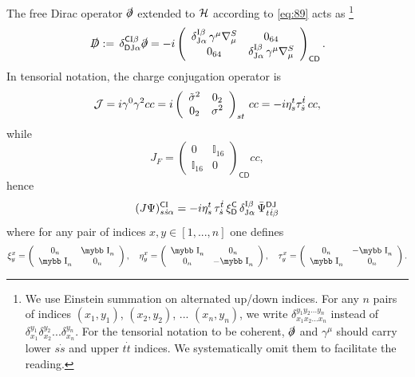 \documentclass[11pt]{article}
\newcommand{\ds}{\slashed \partial}
\def\bb#1{\hbox{\mybb#1}}
\newcommand{\del}{\partial}
\newcommand{\dotspinind}[1]{\mathit{\dot #1}}
\newcommand{\colorind}[1]{{\mathrm{#1}}}
\newcommand{\flavind}[1]{{\mathbf #1}}
\newcommand{\partind}[1]{{\sf #1}}
\newcommand{\sI}{\mathrm  I}
\newcommand{\sJ}{\mathrm J}
\newcommand{\sC}{\mathsf C}
\newcommand{\sD}{\mathsf D}
\begin{document}
 The free Dirac operator $\slashed\del$ extended  to ${\cal H}$
 according to \eqref{eq:89} acts as {\footnote{We use Einstein summation on alternated up/down
    indices. For any $n$ pairs of indices $(x_1,y_1)$, $(x_2, y_2)$, ...
    $(x_n, y_n)$, we write
$\delta_{x_1x_2... x_n}^{y_1y_2... y_n}$ instead of
$\delta_{x_1}^{y_1}\delta_{x_2}^{y_2}... \delta_{x_n}^{y_n}$. For the
tensorial notation to be coherent, $\ds$ and $\gamma^\mu$ should carry lower
$s\dot s$ and upper $t \dot t$ indices. We systematically omit them to
facilitate the reading.}} 
 \begin{equation}
   \label{eq:3-bis}
 \slashed D:=\,\delta^{\sC\sI\beta}_{\sD\sJ\alpha}\slashed \del =
 -i\left(\begin{array}{cc}\delta^{\sI\beta}_{\sJ\alpha}\,\gamma^\mu\nabla_\mu^S&
     0_{64}\\0_{64}&
 \delta^{\sI\beta}_{\sJ\alpha}\,\gamma^\mu\nabla_\mu^S\end{array}\right)_{\sC\sD}.
 \end{equation}
In tensorial notation, the charge conjugation
operator is
\begin{equation}
{\cal J}= i\gamma^0\gamma^2 cc=i\left(
\begin{array}{cc} 
  {{\tilde\sigma}^2}&0_2\\ 
  0_2 & {\sigma^2}
\end{array}\right)_{s t} \, cc = -i\eta_s^t \tau_{\dot s}^{\dot t}\, cc,
\label{eq:2}
\end{equation}
while
\begin{equation}
J_{F}=\left(\begin{array}{cc}
0 & \mathbb{I}_{16}\\
\mathbb{I}_{16} & 0
\end{array}\right)_{\sC\sD} cc,
\end{equation}
hence
\begin{equation}
(J\Psi)^{\partind C\colorind I}_{s\dotspinind s
  \flavind{\alpha}} = - i \eta^t_s\,\tau^{\dot t}_{\dot s}\, \xi^\sC_\sD \, \delta^{\sI\beta}_{\sJ\alpha}\,
\bar \Psi^{\partind D \colorind J
}_{t \dotspinind t \flavind{\beta}}
\label{eq:12}
\end{equation}
where for any pair of indices $x,y \in [1,..., n]$ one defines
\begin{equation}
  \label{eq:22}
  \xi^x_y=\left(\begin{array}{cc} 0_n & \bb I_n \\ \bb I_n &
    0_n \end{array}\right),\quad \eta^x_y=\left(\begin{array}{cc} \bb
    I_n & 0_n \\ 0_n&
   - \bb I_n \end{array}\right), \quad \tau^x_y=\left(\begin{array}{cc} 0_n & -\bb I_n \\ \bb I_n &
    0_n \end{array}\right).
\end{equation}
\end{document}
